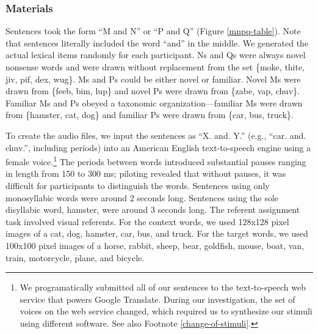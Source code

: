 \documentclass[man,floatsintext]{apa6}
\begin{document}
\subsubsection{Materials}
Sentences took the form ``M and N'' or ``P and Q'' (Figure \ref{mnpq-table}). Note that sentences literally included the word ``and'' in the middle. We generated the actual lexical items randomly for each participant. Ns and Qs were always novel nonsense words and were drawn without replacement from the set \{moke, thite, jiv, pif, dex, wug\}. Ms and Ps could be either novel or familiar. Novel Ms were drawn from \{feeb, bim, lup\} and novel Ps were drawn from \{zabe, vap, chuv\}. Familiar Ms and Ps obeyed a taxonomic organization---familiar Ms were drawn from \{hamster, cat, dog\} and familiar Ps were drawn from \{car, bus, truck\}.

To create the audio files, we input the sentences as ``X. and. Y.'' (e.g., ``car. and. chuv.'', including periods) into an American English text-to-speech engine using a female voice.\footnote{\label{tts}We programatically submitted all of our sentences to the text-to-speech web service that powers Google Translate. During our investigation, the set of voices on the web service changed, which required us to synthesize our stimuli using different software. See also Footnote \ref{change-of-stimuli}.} The periods between words introduced substantial pauses ranging in length from 150 to 300 ms; piloting revealed that without pauses, it was difficult for participants to distinguish the words. Sentences using only monosyllabic words were around 2 seconds long. Sentences using the sole disyllabic word, hamster, were around 3 seconds long.  The referent assignment task involved visual referents. For the context words, we used 128x128 pixel images of a cat, dog, hamster, car, bus, and truck. For the target words, we used 100x100 pixel images of a horse, rabbit, sheep, bear, goldfish, mouse, boat, van, train, motorcycle, plane, and bicycle.
\end{document}
